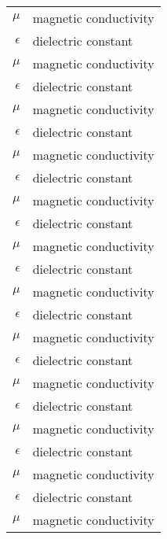 \begin{nomenclature}
\begin{longtable}{rl}
  $\mu$      & magnetic conductivity \\
  $\epsilon$ & dielectric constant   \\
  $\mu$      & magnetic conductivity \\
  $\epsilon$ & dielectric constant   \\
  $\mu$      & magnetic conductivity \\
  $\epsilon$ & dielectric constant   \\
  $\mu$      & magnetic conductivity \\
  $\epsilon$ & dielectric constant   \\
  $\mu$      & magnetic conductivity \\
  $\epsilon$ & dielectric constant   \\
  $\mu$      & magnetic conductivity \\
  $\epsilon$ & dielectric constant   \\
  $\mu$      & magnetic conductivity \\
  $\epsilon$ & dielectric constant   \\
  $\mu$      & magnetic conductivity \\
  $\epsilon$ & dielectric constant   \\
  $\mu$      & magnetic conductivity \\
  $\epsilon$ & dielectric constant   \\
  $\mu$      & magnetic conductivity \\
  $\epsilon$ & dielectric constant   \\
  $\mu$      & magnetic conductivity \\
  $\epsilon$ & dielectric constant   \\
  $\mu$      & magnetic conductivity \\
\end{longtable}

\end{nomenclature}
